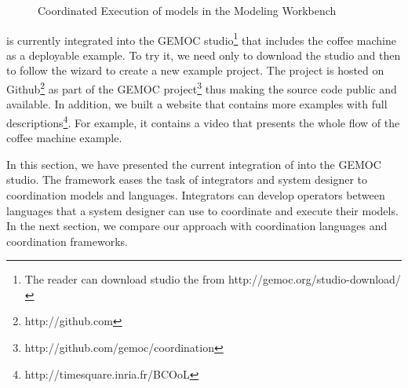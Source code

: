 \begin{figure}[h]
	\centering
	\caption{Coordinated Execution of models in the Modeling Workbench}
	\label{fig:subfigureExample1}
\end{figure}

\bcool is currently integrated into the GEMOC studio\footnote{The reader can download studio the from http://gemoc.org/studio-download/} that includes the coffee machine as a deployable example. To try it, we need only to download the studio and then to follow the wizard to create a new example project. The project \bcool is hosted on Github\footnote{http://github.com} as part of the GEMOC project\footnote{http://github.com/gemoc/coordination} thus making the source code public and available. In addition, we built a website that contains more examples with full descriptions\footnote{http://timesquare.inria.fr/BCOoL}. For example, it contains a video that presents the whole flow of the coffee machine example. 

In this section, we have presented the current integration of \bcool into the GEMOC studio. The framework eases the task of integrators and system designer to coordination models and languages. Integrators can develop operators between languages that a system designer can use to coordinate and execute their models. In the next section, we compare our approach with coordination languages and coordination frameworks.  

